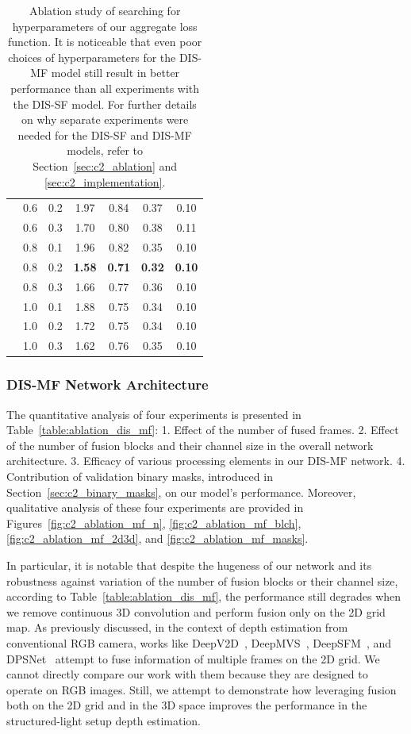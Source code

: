 \begin{table}[!t]
\begin{center}
\begin{tabular}{c|cc|cccc}
        & 0.6 & 0.2 & 1.97 & 0.84 & 0.37 & 0.10 \\
        & 0.6 & 0.3 & 1.70 & 0.80 & 0.38 & 0.11 \\
        & 0.8 & 0.1 & 1.96 & 0.82 & 0.35 & 0.10 \\
        & 0.8 & 0.2 & \textbf{1.58} & \textbf{0.71} & \textbf{0.32} & \textbf{0.10} \\
        & 0.8 & 0.3 & 1.66 & 0.77 & 0.36 & 0.10 \\
        & 1.0 & 0.1 & 1.88 & 0.75 & 0.34 & 0.10 \\
        & 1.0 & 0.2 & 1.72 & 0.75 & 0.34 & 0.10 \\
        & 1.0 & 0.3 & 1.62 & 0.76 & 0.35 & 0.10 \\
        \hline
        \end{tabular}
    \end{center}
    \caption{Ablation study of searching for hyperparameters of our aggregate loss function. It is noticeable that even poor choices of hyperparameters for the DIS-MF model still result in better performance than all experiments with the DIS-SF model. For further details on why separate experiments were needed for the DIS-SF and DIS-MF models, refer to Section~\ref{sec:c2_ablation} and \ref{sec:c2_implementation}.}
    \label{table:ablation_hyperparams}
\end{table}

\subsubsection{DIS-MF Network Architecture}
The quantitative analysis of four experiments is presented in Table~\ref{table:ablation_dis_mf}: 1. Effect of the number of fused frames. 2. Effect of the number of fusion blocks and their channel size in the overall network architecture. 3. Efficacy of various processing elements in our DIS-MF network. 4. Contribution of validation binary masks, introduced in Section~\ref{sec:c2_binary_masks}, on our model's performance. Moreover, qualitative analysis of these four experiments are provided in Figures~\ref{fig:c2_ablation_mf_n}, \ref{fig:c2_ablation_mf_blch}, \ref{fig:c2_ablation_mf_2d3d}, and \ref{fig:c2_ablation_mf_masks}.

In particular, it is notable that despite the hugeness of our network and its robustness against variation of the number of fusion blocks or their channel size, according to Table~\ref{table:ablation_dis_mf}, the performance still degrades when we remove continuous 3D convolution and perform fusion only on the 2D grid map. As previously discussed, in the context of depth estimation from conventional RGB camera, works like DeepV2D~\citep{teed2019deepv2d}, DeepMVS~\citep{huang2018deepmvs}, DeepSFM~\citep{wei2020deepsfm}, and DPSNet~\citep{im2018dpsnet} attempt to fuse information of multiple frames on the 2D grid. We cannot directly compare our work with them because they are designed to operate on RGB images. Still, we attempt to demonstrate how leveraging fusion both on the 2D grid and in the 3D space improves the performance in the structured-light setup depth estimation.


